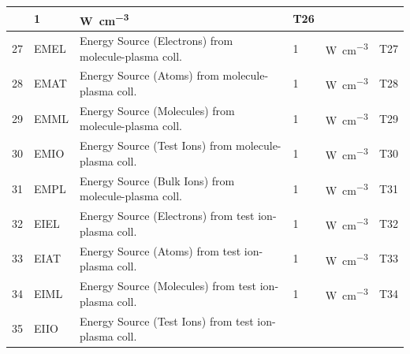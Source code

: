\begin{landscape}
\begin{longtable}{|r|l|l|l|l|c|}
					     & 1                                &
    \si{\watt\per\cubic\centi\metre}         & T26
    \\  \hline
    27                                       & EMEL                             & Energy
    Source (Electrons) from molecule-plasma coll.
					     & 1                                &
    \si{\watt\per\cubic\centi\metre}         & T27
    \\   \hline
    28                                       & EMAT                             & Energy
    Source (Atoms) from molecule-plasma coll.
					     & 1                                &
    \si{\watt\per\cubic\centi\metre}         & T28
    \\   \hline
    29                                       & EMML                             & Energy
    Source (Molecules) from molecule-plasma coll.
					     & 1                                &
    \si{\watt\per\cubic\centi\metre}         & T29
    \\   \hline
    30                                       & EMIO                             & Energy
    Source (Test Ions) from molecule-plasma coll.
					     & 1                                &
    \si{\watt\per\cubic\centi\metre}         & T30
    \\	\hline
    31                                       & EMPL                             & Energy
    Source (Bulk Ions) from molecule-plasma coll.
					     & 1                                &
    \si{\watt\per\cubic\centi\metre}         & T31
    \\  \hline
    32                                       & EIEL                             & Energy
    Source (Electrons) from test ion-plasma coll.
					     & 1                                &
    \si{\watt\per\cubic\centi\metre}         & T32
    \\  \hline
    33                                       & EIAT                             & Energy
    Source (Atoms) from test ion-plasma coll.
					     & 1                                &
    \si{\watt\per\cubic\centi\metre}         & T33
    \\  \hline
    34                                       & EIML                             & Energy
    Source (Molecules) from test ion-plasma coll.
					     & 1                                &
    \si{\watt\per\cubic\centi\metre}         & T34
    \\  \hline
    35                                       & EIIO                             & Energy
    Source (Test Ions) from test ion-plasma coll.

\end{longtable}
\end{landscape}
